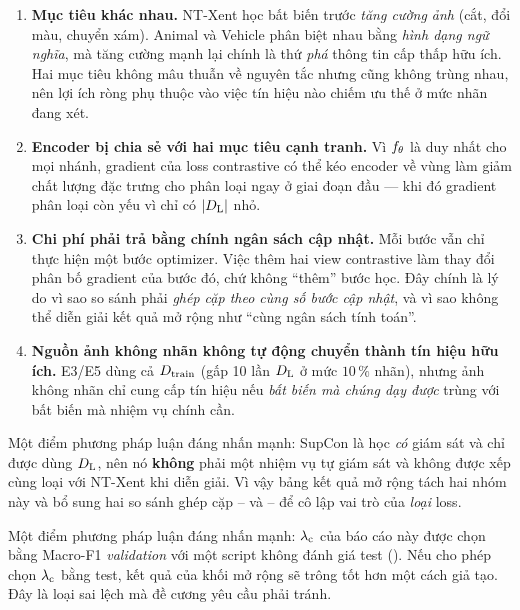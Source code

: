 \begin{enumerate}[leftmargin=1.2cm,itemsep=3pt]
  \item \textbf{Mục tiêu khác nhau.} NT-Xent học bất biến trước \emph{tăng cường ảnh} (cắt, đổi
        màu, chuyển xám). Animal và Vehicle phân biệt nhau bằng \emph{hình dạng ngữ nghĩa}, mà
        tăng cường mạnh lại chính là thứ \emph{phá} thông tin cấp thấp hữu ích. Hai mục tiêu
        không mâu thuẫn về nguyên tắc nhưng cũng không trùng nhau, nên lợi ích ròng phụ thuộc
        vào việc tín hiệu nào chiếm ưu thế ở mức nhãn đang xét.
  \item \textbf{Encoder bị chia sẻ với hai mục tiêu cạnh tranh.} Vì $f_{\theta}$ là duy nhất cho mọi
        nhánh, gradient của loss contrastive có thể kéo encoder về vùng làm giảm chất lượng đặc
        trưng cho phân loại ngay ở giai đoạn đầu — khi đó gradient phân loại còn yếu vì chỉ có
        $|D_{\mathrm{L}}|$ nhỏ.
  \item \textbf{Chi phí phải trả bằng chính ngân sách cập nhật.} Mỗi bước vẫn chỉ thực hiện một
        bước optimizer. Việc thêm hai view contrastive làm thay đổi phân bố gradient của bước
        đó, chứ không \enquote{thêm} bước học. Đây chính là lý do vì sao so sánh phải \emph{ghép
        cặp theo cùng số bước cập nhật}, và vì sao không thể diễn giải kết quả mở rộng như
        \enquote{cùng ngân sách tính toán}.
  \item \textbf{Nguồn ảnh không nhãn không tự động chuyển thành tín hiệu hữu ích.} E3/E5 dùng
        cả $D_{\mathrm{train}}$ (gấp 10 lần $D_{\mathrm{L}}$ ở mức $10\,\%$ nhãn), nhưng ảnh không nhãn chỉ cung cấp
        tín hiệu nếu \emph{bất biến mà chúng dạy được} trùng với bất biến mà nhiệm vụ chính cần.
\end{enumerate}

Một điểm phương pháp luận đáng nhấn mạnh: SupCon là học \emph{có} giám sát và chỉ được dùng
$D_{\mathrm{L}}$, nên nó \textbf{không} phải một nhiệm vụ tự giám sát và không được xếp cùng loại với
NT-Xent khi diễn giải. Vì vậy bảng kết quả mở rộng tách hai nhóm này và bổ sung hai so sánh
ghép cặp -- và -- để cô lập vai trò của \emph{loại} loss.

\RExtensionAnalysis

Một điểm phương pháp luận đáng nhấn mạnh: $\lambda_{\mathrm{c}}$ của báo cáo này được chọn bằng
Macro-F1 \emph{validation} với một script không đánh giá test
(). Nếu cho phép chọn $\lambda_{\mathrm{c}}$ bằng test, kết quả của khối mở
rộng sẽ trông tốt hơn một cách giả tạo. Đây là loại sai lệch mà đề cương yêu cầu phải tránh.

